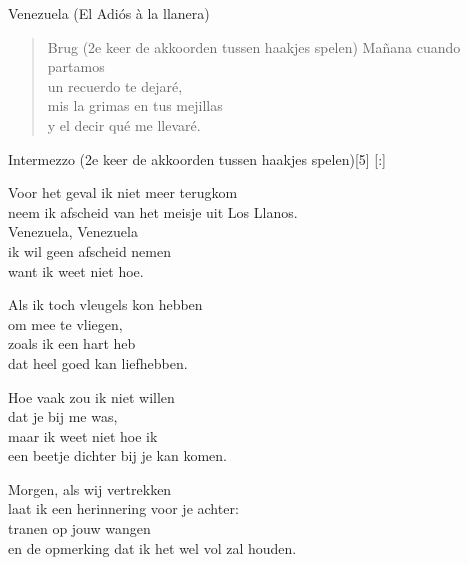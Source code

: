 \begin{song}[joropo]{Venezuela (El Adiós à la llanera)}
\begin{verse}{Brug (2e keer de akkoorden tussen haakjes spelen)}
Ma\~{n}ana cuando partamos\\
un recuerdo te dejar\'{e},\hspace{2em}\hspace{5em}\\
mis la grimas en tus mejillas\\
y el decir qu\'{e} me llevar\'{e}.
\end{verse}
\begin{instrumental}{Intermezzo (2e keer de akkoorden tussen haakjes spelen)}[5]
  \measure{}  \measure{}    [:] 
\end{instrumental}

\end{song}

\clearpage
\begin{translation}
Voor het geval ik niet meer terugkom\\
neem ik afscheid van het meisje uit Los Llanos.\\
Venezuela, Venezuela\\
ik wil geen afscheid nemen\\
want ik weet niet hoe.\vspace{\wlskip}

Als ik toch vleugels kon hebben\\
om mee te vliegen,\\
zoals ik een hart heb\\
dat heel goed kan liefhebben.\vspace{\wlskip}

Hoe vaak zou ik niet willen\\
dat je bij me was,\\
maar ik weet niet hoe ik\\
een beetje dichter bij je kan komen.\vspace{\wlskip}

Morgen, als wij vertrekken\\
laat ik een herinnering voor je achter:\\
tranen op jouw wangen\\
en de opmerking dat ik het wel vol zal houden. \\
\end{translation}
